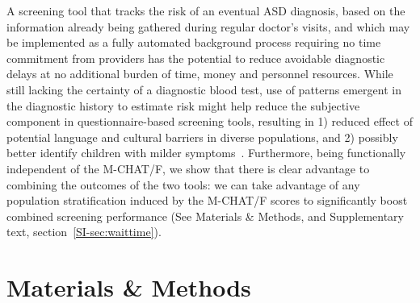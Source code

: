 \documentclass[3p,super,numbers,sort&compress,10pt]{elsarticle}
\begin{document}
A  screening  tool that tracks the risk of an eventual ASD diagnosis,  based  on the information already being gathered during regular doctor's visits, and which may be implemented as a  fully automated background process requiring no time commitment from providers has the potential to reduce avoidable diagnostic  delays at no additional burden of time, money and personnel resources.  While still lacking the certainty of a diagnostic blood test,  use of patterns emergent in  the diagnostic history to estimate risk might help reduce the subjective component in questionnaire-based screening tools, resulting in 1) reduced effect of potential language and cultural barriers in diverse populations, and 2) possibly better identify children with milder symptoms~\cite{hyman2020identification}.
Furthermore, being functionally independent of the M-CHAT/F, we show that there is clear advantage to combining the outcomes of the two tools: we can take advantage of any population stratification induced by the M-CHAT/F scores to significantly boost combined screening performance (See Materials \&  Methods, and Supplementary text, section~\ref{SI-sec:waittime}).
 



\section*{Materials \& Methods}
\end{document}
